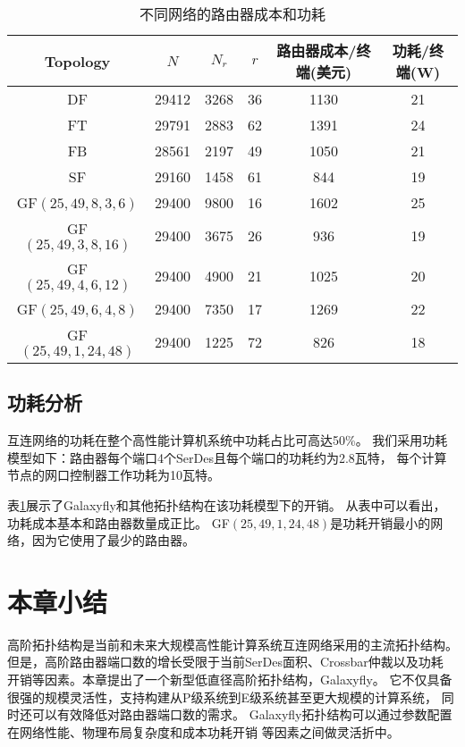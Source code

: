 \begin{table}[t]
\centering
\caption{不同网络的路由器成本和功耗}
\begin{tabular}{cccccc}
  \toprule
  Topology & $N$ & $N_r$ & $r$ & 路由器成本/终端(美元) & 功耗/终端(W)\\
  \midrule
  DF & 29412 & 3268 & 36 & 1130 & 21 \\
  FT & 29791 & 2883 &62 & 1391 & 24\\
  FB & 28561 & 2197 &49 &1050 &21 \\	
  SF & 29160 &1458 & 61 & 844 & 19\\	
  GF$(25,49,8,3,6)$ &29400 &9800 &16 &1602 &25 \\
  GF$(25,49,3,8,16)$ &29400 &3675 &26 &936 &19 \\
  GF$(25,49,4,6,12)$ &29400 &4900 &21 &1025 &20 \\
  GF$(25,49,6,4,8)$ &29400 &7350 &17 &1269 &22 \\
  GF$(25,49,1,24,48)$ &29400 &1225 &72 &826 &18 \\
  \bottomrule
\end{tabular}
 \label{chap3table7}
\end{table}


\subsection{功耗分析}

互连网络的功耗在整个高性能计算机系统中功耗占比可高达50\%。
我们采用功耗模型如下：路由器每个端口4个SerDes且每个端口的功耗约为2.8瓦特，
每个计算节点的网口控制器工作功耗为10瓦特。

表\ref{chap3table7}展示了Galaxyfly和其他拓扑结构在该功耗模型下的开销。
从表中可以看出，功耗成本基本和路由器数量成正比。
GF$(25,49,1,24,48)$是功耗开销最小的网络，因为它使用了最少的路由器。

\section{本章小结}

高阶拓扑结构是当前和未来大规模高性能计算系统互连网络采用的主流拓扑结构。
但是，高阶路由器端口数的增长受限于当前SerDes面积、Crossbar仲裁以及功耗
开销等因素。本章提出了一个新型低直径高阶拓扑结构，Galaxyfly。
它不仅具备很强的规模灵活性，支持构建从P级系统到E级系统甚至更大规模的计算系统，
同时还可以有效降低对路由器端口数的需求。
Galaxyfly拓扑结构可以通过参数配置在网络性能、物理布局复杂度和成本功耗开销
等因素之间做灵活折中。
